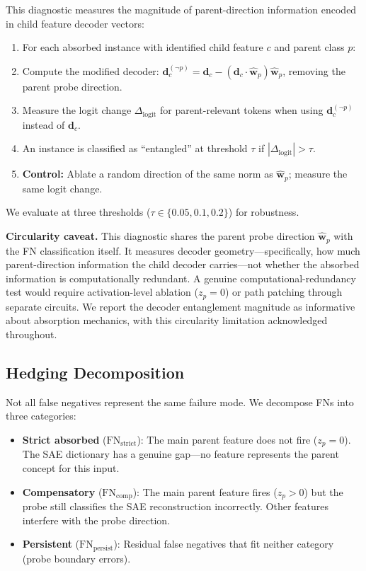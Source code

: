 \documentclass{article}
\begin{document}
This diagnostic measures the magnitude of parent-direction information encoded in child feature decoder vectors:

\begin{enumerate}
\item For each absorbed instance with identified child feature $c$ and parent class $p$:
\item Compute the modified decoder: $\mathbf{d}_c^{(\neg p)} = \mathbf{d}_c - (\mathbf{d}_c \cdot \hat{\mathbf{w}}_p)\hat{\mathbf{w}}_p$, removing the parent probe direction.
\item Measure the logit change $\Delta_{\text{logit}}$ for parent-relevant tokens when using $\mathbf{d}_c^{(\neg p)}$ instead of $\mathbf{d}_c$.
\item An instance is classified as ``entangled'' at threshold $\tau$ if $|\Delta_{\text{logit}}| > \tau$.
\item \textbf{Control:} Ablate a random direction of the same norm as $\hat{\mathbf{w}}_p$; measure the same logit change.
\end{enumerate}

We evaluate at three thresholds ($\tau \in \{0.05, 0.1, 0.2\}$) for robustness.

\textbf{Circularity caveat.} This diagnostic shares the parent probe direction $\hat{\mathbf{w}}_p$ with the FN classification itself. It measures decoder geometry---specifically, how much parent-direction information the child decoder carries---not whether the absorbed information is computationally redundant. A genuine computational-redundancy test would require activation-level ablation ($z_p = 0$) or path patching through separate circuits. We report the decoder entanglement magnitude as informative about absorption mechanics, with this circularity limitation acknowledged throughout.

\subsection{Hedging Decomposition}

Not all false negatives represent the same failure mode. We decompose FNs into three categories:

\begin{itemize}
\item \textbf{Strict absorbed} ($\text{FN}_{\text{strict}}$): The main parent feature does not fire ($z_p = 0$). The SAE dictionary has a genuine gap---no feature represents the parent concept for this input.
\item \textbf{Compensatory} ($\text{FN}_{\text{comp}}$): The main parent feature fires ($z_p > 0$) but the probe still classifies the SAE reconstruction incorrectly. Other features interfere with the probe direction.
\item \textbf{Persistent} ($\text{FN}_{\text{persist}}$): Residual false negatives that fit neither category (probe boundary errors).
\end{itemize}
\end{document}
